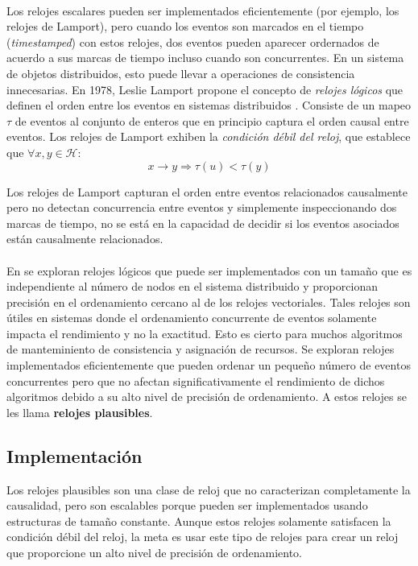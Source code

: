 \documentclass[12pt, times]{simauth}
\begin{document}
\paragraph{}Los relojes escalares pueden ser implementados eficientemente (por ejemplo, los relojes de Lamport), pero cuando los eventos son marcados en el tiempo (\emph{timestamped}) con estos relojes, dos eventos pueden aparecer ordernados de acuerdo a sus marcas de tiempo incluso cuando son concurrentes. En un sistema de objetos distribuidos, esto puede llevar a operaciones de consistencia innecesarias. En 1978, Leslie Lamport propone el concepto de \emph{relojes lógicos} que definen el orden entre los eventos en sistemas distribuidos \cite{lamport}. Consiste de un mapeo $\tau$ de eventos al conjunto de enteros que en principio captura el orden causal entre eventos. Los relojes de Lamport exhiben la \emph{condición débil del reloj}, que establece que $\forall x, y \in \mathcal{H}:$
$$ x \to y \Rightarrow \tau(u) < \tau(y)$$

Los relojes de Lamport capturan el orden entre eventos relacionados causalmente pero no detectan concurrencia entre eventos y simplemente inspeccionando dos marcas de tiempo, no se está en la capacidad de decidir si los eventos asociados están causalmente relacionados.


\paragraph{}En \cite{torres} se exploran relojes lógicos que puede ser implementados con un tamaño que es independiente al número de nodos en el sistema distribuido y proporcionan precisión en el ordenamiento cercano al de los relojes vectoriales. Tales relojes son útiles en sistemas donde el ordenamiento concurrente de eventos solamente impacta el rendimiento y no la exactitud. Esto es cierto para muchos algoritmos de manteminiento de consistencia y asignación de recursos. Se exploran relojes implementados eficientemente que pueden ordenar un pequeño número de eventos concurrentes pero que no afectan significativamente el rendimiento de dichos algoritmos debido a su alto nivel de precisión de ordenamiento. A estos relojes se les llama \textbf{relojes plausibles}.
 
\subsection{Implementación}
Los relojes plausibles son una clase de reloj que no caracterizan completamente la causalidad, pero son escalables porque pueden ser implementados usando estructuras de tamaño constante. Aunque estos relojes solamente satisfacen la condición débil del reloj, la meta es usar este tipo de relojes para crear un reloj que proporcione un alto nivel de precisión de ordenamiento.
\end{document}

